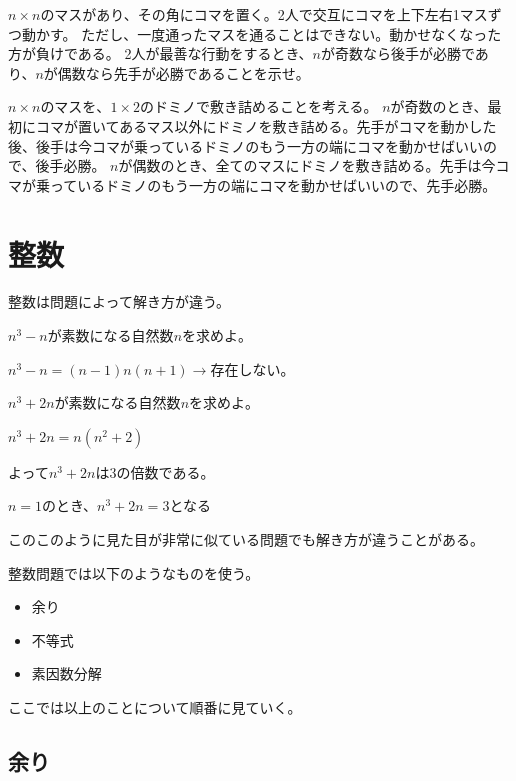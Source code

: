 \documentclass[uplatex,dvipdfmx]{jsbook}
\begin{document}
\begin{problem}[練習問題2]
    $n \times n$のマスがあり、その角にコマを置く。2人で交互にコマを上下左右1マスずつ動かす。
    ただし、一度通ったマスを通ることはできない。動かせなくなった方が負けである。
    2人が最善な行動をするとき、$n$が奇数なら後手が必勝であり、$n$が偶数なら先手が必勝であることを示せ。
\end{problem}

\begin{answer}
    $n \times n$のマスを、$1\times 2$のドミノで敷き詰めることを考える。
    $n$が奇数のとき、最初にコマが置いてあるマス以外にドミノを敷き詰める。先手がコマを動かした後、後手は今コマが乗っているドミノのもう一方の端にコマを動かせばいいので、後手必勝。
    $n$が偶数のとき、全てのマスにドミノを敷き詰める。先手は今コマが乗っているドミノのもう一方の端にコマを動かせばいいので、先手必勝。
\end{answer}

\chapter{整数}
整数は問題によって解き方が違う。
\begin{problem}[例1]
    $n^3-n$が素数になる自然数$n$を求めよ。

    $n^3-n=\left(n-1\right)n\left(n+1\right)\rightarrow$存在しない。
\end{problem}

\begin{problem}[例2]

    $n^3+2n$が素数になる自然数$n$を求めよ。

    $n^3+2n=n\left(n^2+2\right)$

    よって$n^3+2n$は$3$の倍数である。

    $n=1$のとき、$n^3+2n=3$となる
\end{problem}

このこのように見た目が非常に似ている問題でも解き方が違うことがある。

整数問題では以下のようなものを使う。

\begin{itemize}
    \item {余り}
    \item {不等式}
    \item {素因数分解}
\end{itemize}

ここでは以上のことについて順番に見ていく。

\section{余り}
\end{document}
